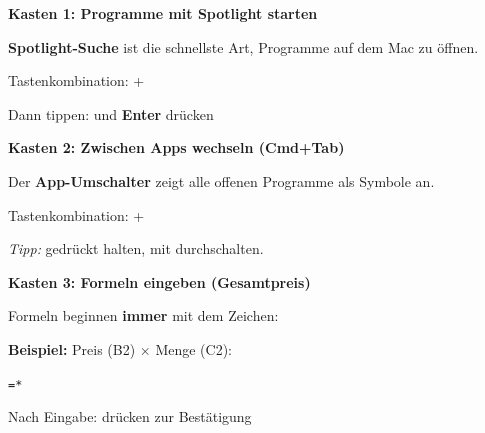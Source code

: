 \documentclass[11pt, a4paper]{article}
\newcommand{\luecke}[1]{\underline{\hspace{#1}}}
\begin{document}
\begin{multicols}{2}


\textbf{\textcolor{fachfarbe}{Kasten 1: Programme mit Spotlight starten}}

\begin{lueckenkasten}
\textbf{Spotlight-Suche} ist die schnellste Art, Programme auf dem Mac zu öffnen.

\vspace{0.2em}
Tastenkombination: \luecke{1.5cm} + \luecke{2cm}

\vspace{0.2em}
Dann tippen: \luecke{2.5cm} und \textbf{Enter} drücken
\end{lueckenkasten}


\textbf{\textcolor{fachfarbe}{Kasten 2: Zwischen Apps wechseln (Cmd+Tab)}}

\begin{lueckenkasten}
Der \textbf{App-Umschalter} zeigt alle offenen Programme als Symbole an.

\vspace{0.2em}
Tastenkombination: \luecke{1.5cm} + \luecke{1.5cm}

\vspace{0.2em}
\textit{Tipp:} \luecke{1.5cm} gedrückt halten, mit \luecke{1.5cm} durchschalten.
\end{lueckenkasten}


\textbf{\textcolor{fachfarbe}{Kasten 3: Formeln eingeben (Gesamtpreis)}}

\begin{lueckenkasten}
Formeln beginnen \textbf{immer} mit dem Zeichen: \luecke{1cm}

\vspace{0.2em}
\textbf{Beispiel:} Preis (B2) $\times$ Menge (C2):

\texttt{=}\luecke{1cm}\texttt{*}\luecke{1cm}

\vspace{0.2em}
Nach Eingabe: \luecke{2cm} drücken zur Bestätigung
\end{lueckenkasten}


\end{multicols}
\end{document}
